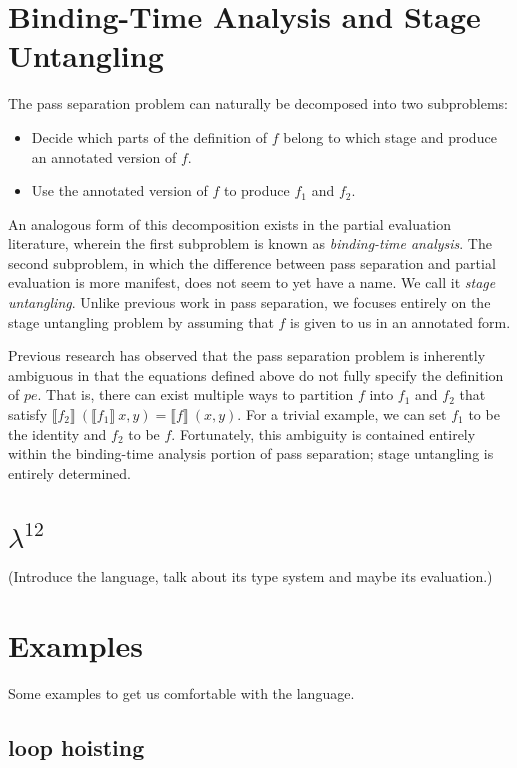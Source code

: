 \documentclass{article}
\begin{document}
\section{Binding-Time Analysis and Stage Untangling}

The pass separation problem can naturally be decomposed into two subproblems:
\begin{itemize}
\item Decide which parts of the definition of $f$ belong to which stage and produce an annotated version of $f$.
\item Use the annotated version of $f$ to produce $f_1$ and $f_2$.  
\end{itemize}

An analogous form of this decomposition exists in the partial evaluation literature, wherein the first subproblem is known as {\em binding-time analysis}.  The second subproblem, in which the difference between pass separation and partial evaluation is more manifest, does not seem to yet have a name.  We call it {\em stage untangling}.  Unlike previous work in pass separation, we focuses entirely on the stage untangling problem by assuming that $f$ is given to us in an annotated form. 

Previous research has observed that the pass separation problem is inherently ambiguous in that the equations defined above do not fully specify the definition of $pe$.  That is, there can exist multiple ways to partition $f$ into $f_1$ and $f_2$ that satisfy $\llbracket f_2\rrbracket~(\llbracket f_1\rrbracket~x,y) = \llbracket f\rrbracket~(x,y)$.  For a trivial example, we can set $f_1$ to be the identity and $f_2$ to be $f$. Fortunately, this ambiguity is contained entirely within the binding-time analysis portion of pass separation; stage untangling is entirely determined.

\section{$\lambda^{12}$}

(Introduce the language, talk about its type system and maybe its evaluation.)

\section{Examples}

Some examples to get us comfortable with the language.

\subsection{loop hoisting}
\end{document}
